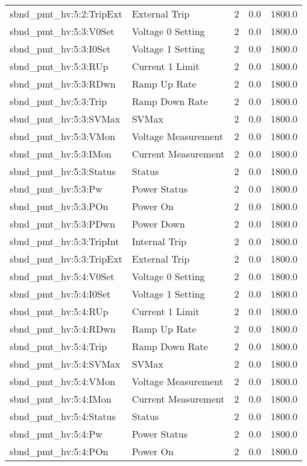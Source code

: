 \begin{center}
\begin{longtable}{l | l l l l }
sbnd\_pmt\_hv:5:2:TripExt & External Trip & 2 & 0.0 & 1800.0\\ 
sbnd\_pmt\_hv:5:3:V0Set & Voltage 0 Setting & 2 & 0.0 & 1800.0\\ 
sbnd\_pmt\_hv:5:3:I0Set & Voltage 1 Setting & 2 & 0.0 & 1800.0\\ 
sbnd\_pmt\_hv:5:3:RUp & Current 1 Limit & 2 & 0.0 & 1800.0\\ 
sbnd\_pmt\_hv:5:3:RDwn & Ramp Up Rate & 2 & 0.0 & 1800.0\\ 
sbnd\_pmt\_hv:5:3:Trip & Ramp Down Rate & 2 & 0.0 & 1800.0\\ 
sbnd\_pmt\_hv:5:3:SVMax & SVMax & 2 & 0.0 & 1800.0\\ 
sbnd\_pmt\_hv:5:3:VMon & Voltage Measurement & 2 & 0.0 & 1800.0\\ 
sbnd\_pmt\_hv:5:3:IMon & Current Measurement & 2 & 0.0 & 1800.0\\ 
sbnd\_pmt\_hv:5:3:Status & Status & 2 & 0.0 & 1800.0\\ 
sbnd\_pmt\_hv:5:3:Pw & Power Status & 2 & 0.0 & 1800.0\\ 
sbnd\_pmt\_hv:5:3:POn & Power On & 2 & 0.0 & 1800.0\\ 
sbnd\_pmt\_hv:5:3:PDwn & Power Down & 2 & 0.0 & 1800.0\\ 
sbnd\_pmt\_hv:5:3:TripInt & Internal Trip & 2 & 0.0 & 1800.0\\ 
sbnd\_pmt\_hv:5:3:TripExt & External Trip & 2 & 0.0 & 1800.0\\ 
sbnd\_pmt\_hv:5:4:V0Set & Voltage 0 Setting & 2 & 0.0 & 1800.0\\ 
sbnd\_pmt\_hv:5:4:I0Set & Voltage 1 Setting & 2 & 0.0 & 1800.0\\ 
sbnd\_pmt\_hv:5:4:RUp & Current 1 Limit & 2 & 0.0 & 1800.0\\ 
sbnd\_pmt\_hv:5:4:RDwn & Ramp Up Rate & 2 & 0.0 & 1800.0\\ 
sbnd\_pmt\_hv:5:4:Trip & Ramp Down Rate & 2 & 0.0 & 1800.0\\ 
sbnd\_pmt\_hv:5:4:SVMax & SVMax & 2 & 0.0 & 1800.0\\ 
sbnd\_pmt\_hv:5:4:VMon & Voltage Measurement & 2 & 0.0 & 1800.0\\ 
sbnd\_pmt\_hv:5:4:IMon & Current Measurement & 2 & 0.0 & 1800.0\\ 
sbnd\_pmt\_hv:5:4:Status & Status & 2 & 0.0 & 1800.0\\ 
sbnd\_pmt\_hv:5:4:Pw & Power Status & 2 & 0.0 & 1800.0\\ 
sbnd\_pmt\_hv:5:4:POn & Power On & 2 & 0.0 & 1800.0\\ 

\end{longtable}
\end{center}

